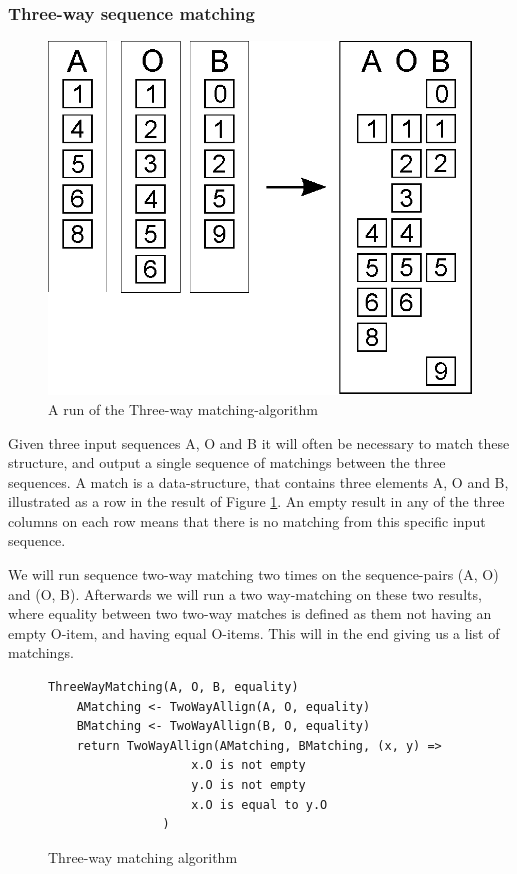 \documentclass[11pt]{article}
\begin{document}
\subsubsection{Three-way sequence matching}
\begin{figure}
   \centerline{\includegraphics[scale=0.4]{drawings/eps/threewaymatching.eps}}
   \caption{A run of the Three-way matching-algorithm}
   \label{ThreewayMatching}
\end{figure}

Given three input sequences A, O and B it will often be necessary to match these structure, and output a single sequence of matchings between the three sequences. A match is a data-structure, that contains three elements A, O and B, illustrated as a row in the result of Figure \ref{ThreewayMatching}. An empty result in any of the three columns on each row means that there is no matching from this specific input sequence.

We will run sequence two-way matching two times on the sequence-pairs (A, O) and (O, B). Afterwards we will run a two way-matching on these two results, where equality between two two-way matches is defined as them not having an empty O-item, and having equal O-items. This will in the end giving us a list of matchings.
\begin{figure}
\begin{verbatim}
ThreeWayMatching(A, O, B, equality)
    AMatching <- TwoWayAllign(A, O, equality)
    BMatching <- TwoWayAllign(B, O, equality)
    return TwoWayAllign(AMatching, BMatching, (x, y) =>
                    x.O is not empty
                    y.O is not empty
                    x.O is equal to y.O
                )

\end{verbatim}
\caption{Three-way matching algorithm}
  \label{ThreeWayMatchingAlgorithm}
\end{figure}
\end{document}
